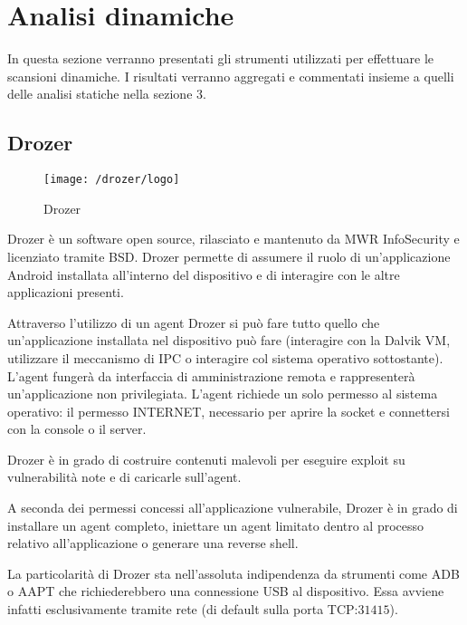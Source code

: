 \chapter{Analisi dinamiche}
In questa sezione verranno presentati gli strumenti utilizzati per effettuare le scansioni dinamiche. I risultati verranno aggregati e commentati insieme a quelli delle analisi statiche nella sezione $3$.


\section{Drozer}

\begin{figure}[h]
	\centering 
	\texttt{[image: /drozer/logo]} 
	\caption{Drozer}
	\label{fig:drozer}
\end{figure}

Drozer\cite{Drozer} è un software open source, rilasciato e mantenuto da MWR InfoSecurity e licenziato tramite BSD. Drozer permette di assumere il ruolo di un'applicazione Android installata all'interno del dispositivo e di interagire con le altre applicazioni presenti.

Attraverso l'utilizzo di un agent Drozer si può fare tutto quello che un'applicazione installata nel dispositivo può fare (interagire con la Dalvik VM, utilizzare il meccanismo di \ac{IPC} o interagire col sistema operativo sottostante). L'agent fungerà da interfaccia di amministrazione remota e rappresenterà un'applicazione non privilegiata. L'agent richiede un solo permesso al sistema operativo: il permesso INTERNET, necessario per aprire la socket e connettersi con la console o il server. 

Drozer è in grado di costruire contenuti malevoli per eseguire exploit su vulnerabilità note e di caricarle sull'agent.

A seconda dei permessi concessi all'applicazione vulnerabile, Drozer è in grado di installare un agent completo, iniettare un agent limitato dentro al processo relativo all'applicazione o generare una reverse shell.

La particolarità di Drozer sta nell'assoluta indipendenza da strumenti come ADB o \ac{AAPT} che richiederebbero una connessione USB al dispositivo. Essa avviene infatti esclusivamente tramite rete (di default sulla porta TCP:$31415$).

